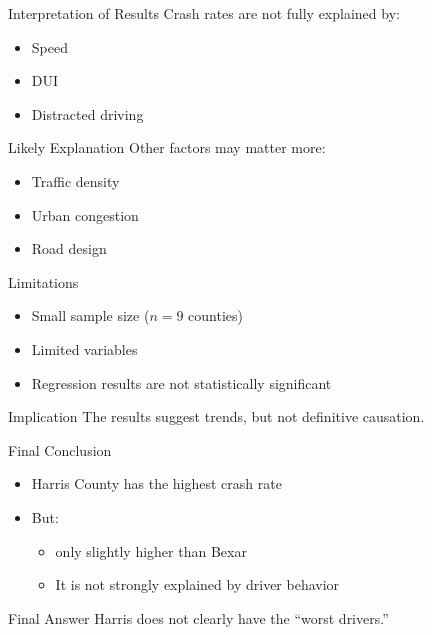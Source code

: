 \documentclass[
  ignorenonframetext,
  aspectratio=169]{beamer}
\providecommand{\tightlist}{%
  \setlength{\itemsep}{0pt}\setlength{\parskip}{0pt}}
\begin{document}
\begin{frame}{Interpretation of Results}
\label{interpretation-of-results}
Crash rates are not fully explained by:

\begin{itemize}
\tightlist
\item
  Speed
\item
  DUI
\item
  Distracted driving
\end{itemize}

\begin{block}{Likely Explanation}
\label{likely-explanation}
Other factors may matter more:

\begin{itemize}
\tightlist
\item
  Traffic density
\item
  Urban congestion
\item
  Road design
\end{itemize}
\end{block}
\end{frame}

\begin{frame}{Limitations}
\label{limitations}
\begin{itemize}
\tightlist
\item
  Small sample size (\(n = 9\) counties)
\item
  Limited variables
\item
  Regression results are not statistically significant
\end{itemize}

\begin{block}{Implication}
\label{implication}
The results suggest trends, but not definitive causation.
\end{block}
\end{frame}

\begin{frame}{Final Conclusion}
\label{final-conclusion}
\begin{itemize}
\tightlist
\item
  Harris County has the highest crash rate
\item
  But:

  \begin{itemize}
  \tightlist
  \item
    only slightly higher than Bexar
  \item
    It is not strongly explained by driver behavior
  \end{itemize}
\end{itemize}

\begin{block}{Final Answer}
\label{final-answer}
Harris does not clearly have the ``worst drivers.''
\end{block}
\end{frame}
\end{document}
